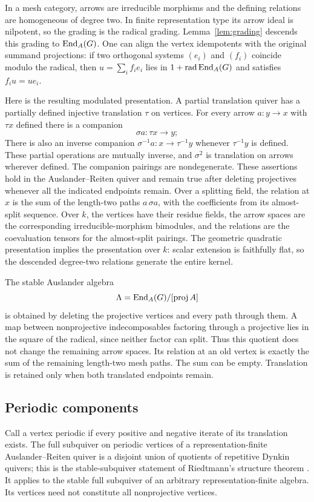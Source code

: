 In a mesh category, arrows are irreducible morphisms and the defining relations are homogeneous of degree two. In finite representation type its arrow ideal is nilpotent, so the grading is the radical grading. Lemma~\ref{lem:grading} descends this grading to $\operatorname{End}_A(G)$. One can align the vertex idempotents with the original summand projections: if two orthogonal systems $(e_i)$ and $(f_i)$ coincide modulo the radical, then
$u=\sum_i f_i e_i$ lies in $1+\operatorname{rad}\operatorname{End}_A(G)$ and satisfies $f_i u=u e_i$.

Here is the resulting modulated presentation. A partial translation quiver has a partially defined injective translation $\tau$ on vertices. For every arrow $a:y\to x$ with $\tau x$ defined there is a companion
\[
 \sigma a:\tau x\longrightarrow y;
\]
There is also an inverse companion $\sigma^{-1}a:x\to\tau^{-1}y$ whenever $\tau^{-1}y$ is defined. These partial operations are mutually inverse, and $\sigma^2$ is translation on arrows wherever defined. The companion pairings are nondegenerate. These assertions hold in the Auslander--Reiten quiver and remain true after deleting projectives whenever all the indicated endpoints remain. Over a splitting field, the relation at $x$ is the sum of the length-two paths $a\,\sigma a$, with the coefficients from its almost-split sequence. Over $k$, the vertices have their residue fields, the arrow spaces are the corresponding irreducible-morphism bimodules, and the relations are the coevaluation tensors for the almost-split pairings. The geometric quadratic presentation implies the presentation over $k$: scalar extension is faithfully flat, so the descended degree-two relations generate the entire kernel.

The stable Auslander algebra
\[
 \Lambda=\operatorname{End}_A(G)/[\operatorname{proj} A]
\]
is obtained by deleting the projective vertices and every path through them. A map between nonprojective indecomposables factoring through a projective lies in the square of the radical, since neither factor can split. Thus this quotient does not change the remaining arrow spaces. Its relation at an old vertex is exactly the sum of the remaining length-two mesh paths. The sum can be empty. Translation is retained only when both translated endpoints remain.

\subsection{Periodic components}

Call a vertex periodic if every positive and negative iterate of its translation exists. The full subquiver on periodic vertices of a representation-finite Auslander--Reiten quiver is a disjoint union of quotients of repetitive Dynkin quivers; this is the stable-subquiver statement of Riedtmann's structure theorem \cite[Hauptsatz]{Riedtmann}. It applies to the stable full subquiver of an arbitrary representation-finite algebra. Its vertices need not constitute all nonprojective vertices.

